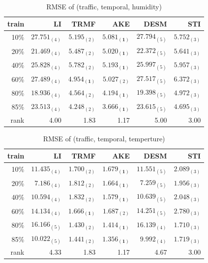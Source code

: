 \begin{table} [htbp]
\centering
\caption{RMSE of (traffic, temporal, humidity)}
\label{table:traffic_temporal_hum}
\begin{tabular}{ r | r r r r r}
	train	&LI	&TRMF	&AKE	&DESM	&STI\\ \hline
	10\% & $ 27.751_{(4)} $ & $ 5.195_{(2)} $ & $ \mathbf{ 5.081_{(1)} } $ & $ 27.794_{(5)} $ & $ 5.752_{(3)} $ \\
	20\% & $ 21.469_{(4)} $ & $ 5.487_{(2)} $ & $ \mathbf{ 5.020_{(1)} } $ & $ 22.372_{(5)} $ & $ 5.641_{(3)} $ \\
	40\% & $ 25.828_{(4)} $ & $ 5.782_{(2)} $ & $ \mathbf{ 5.193_{(1)} } $ & $ 25.997_{(5)} $ & $ 5.957_{(3)} $ \\
	60\% & $ 27.489_{(4)} $ & $ \mathbf{ 4.954_{(1)} } $ & $ 5.027_{(2)} $ & $ 27.517_{(5)} $ & $ 6.372_{(3)} $ \\
	80\% & $ 18.936_{(4)} $ & $ 4.564_{(2)} $ & $ \mathbf{ 4.194_{(1)} } $ & $ 19.398_{(5)} $ & $ 4.972_{(3)} $ \\
	85\% & $ 23.513_{(4)} $ & $ 4.248_{(2)} $ & $ \mathbf{ 3.666_{(1)} } $ & $ 23.615_{(5)} $ & $ 4.695_{(3)} $ \\ \hline
	rank &4.00 &1.83 &1.17 &5.00 &3.00 \\
\end{tabular}
\end{table}


\begin{table} [htbp]
\centering
\caption{RMSE of (traffic, temporal, temperture)}
\label{table:traffic_temporal_tem}
\begin{tabular}{ r | r r r r r}
	train	&LI	&TRMF	&AKE	&DESM	&STI\\ \hline
	10\% & $ 11.435_{(4)} $ & $ 1.700_{(2)} $ & $ \mathbf{ 1.679_{(1)} } $ & $ 11.551_{(5)} $ & $ 2.089_{(3)} $ \\
	20\% & $ 7.186_{(4)} $ & $ 1.812_{(2)} $ & $ \mathbf{ 1.664_{(1)} } $ & $ 7.259_{(5)} $ & $ 1.956_{(3)} $ \\
	40\% & $ 10.594_{(4)} $ & $ 1.832_{(2)} $ & $ \mathbf{ 1.579_{(1)} } $ & $ 10.639_{(5)} $ & $ 2.048_{(3)} $ \\
	60\% & $ 14.134_{(4)} $ & $ \mathbf{ 1.666_{(1)} } $ & $ 1.687_{(2)} $ & $ 14.251_{(5)} $ & $ 2.780_{(3)} $ \\
	80\% & $ 16.166_{(5)} $ & $ 1.430_{(2)} $ & $ \mathbf{ 1.414_{(1)} } $ & $ 16.139_{(4)} $ & $ 1.710_{(3)} $ \\
	85\% & $ 10.022_{(5)} $ & $ 1.441_{(2)} $ & $ \mathbf{ 1.356_{(1)} } $ & $ 9.992_{(4)} $ & $ 1.719_{(3)} $ \\ \hline
	rank &4.33 &1.83 &1.17 &4.67 &3.00 \\
\end{tabular}
\end{table}

